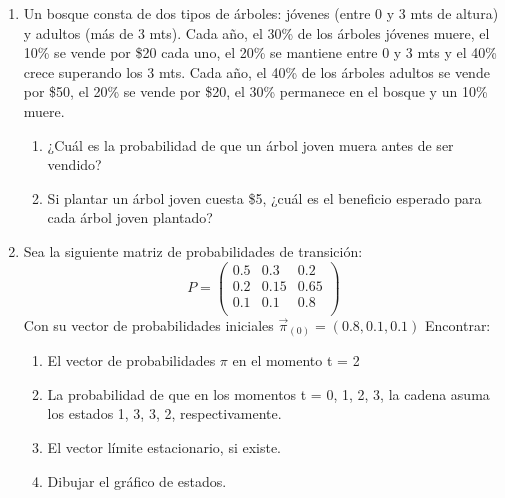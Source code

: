 \documentclass{templateNote}
\begin{document}
\begin{enumerate}[resume, start=8]
    \newpage
    \item Un bosque consta de dos tipos de árboles: jóvenes (entre 0 y 3 mts de altura) y adultos (más
    de 3 mts). Cada año, el 30\% de los árboles jóvenes muere, el 10\% se vende por \$20 cada uno,
    el 20\% se mantiene entre 0 y 3 mts y el 40\% crece superando los 3 mts. Cada año, el 40\% de
    los árboles adultos se vende por \$50, el 20\% se vende por \$20, el 30\% permanece en el bosque
    y un 10\% muere.
    \begin{enumerate}[label=\alph*)]
        \item ¿Cuál es la probabilidad de que un árbol joven muera antes de ser vendido?
        \item Si plantar un árbol joven cuesta \$5, ¿cuál es el beneficio esperado para cada árbol joven plantado?
    \end{enumerate}


    \newpage
    \item Sea la siguiente matriz de probabilidades de transición: 
    \[
    P = \begin{pmatrix}
        0.5 & 0.3   & 0.2 \\
        0.2 & 0.15  & 0.65 \\
        0.1 & 0.1   & 0.8 \\
    \end{pmatrix}
    \]
    Con su vector de probabilidades iniciales $\vec{\pi}_{(0)} = (0.8,0.1,0.1)$
    Encontrar:
    \begin{enumerate}[label=\alph*)]
        \item El vector de probabilidades $\pi$ en el momento t = 2
        \item La probabilidad de que en los momentos t = 0, 1, 2, 3, la cadena asuma los estados 1, 3, 3, 2, respectivamente.
        \item El vector límite estacionario, si existe. 
        \item Dibujar el gráfico de estados.
    \end{enumerate}


\end{enumerate}
\end{document}
